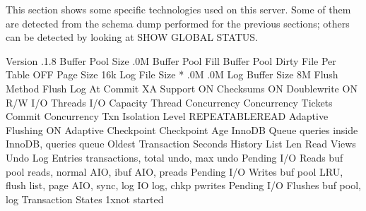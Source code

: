 \documentclass[letterpaper,10pt,english]{sphinxmanual}
\begin{document}
\sphinxAtStartPar
This section shows some specific technologies used on this server. Some of them
are detected from the schema dump performed for the previous sections; others
can be detected by looking at SHOW GLOBAL STATUS.

\begin{sphinxVerbatim}[commandchars=\\\{\}]
                  Version  .1.8
         Buffer Pool Size  .0M
         Buffer Pool Fill  \PYGZpc{}
        Buffer Pool Dirty  \PYGZpc{}
           File Per Table  OFF
                Page Size  16k
            Log File Size   * .0M  .0M
          Log Buffer Size  8M
             Flush Method 
      Flush Log At Commit  
               XA Support  ON
                Checksums  ON
              Doublewrite  ON
          R/W I/O Threads   
             I/O Capacity  
       Thread Concurrency  
      Concurrency Tickets  
       Commit Concurrency  
      Txn Isolation Level  REPEATABLE\PYGZhy{}READ
        Adaptive Flushing  ON
      Adaptive Checkpoint 
           Checkpoint Age  
             InnoDB Queue   queries inside InnoDB,  queries  queue
       Oldest Transaction   Seconds
         History List Len  
               Read Views  
         Undo Log Entries   transactions,  total undo,  max undo
        Pending I/O Reads   buf pool reads,  normal AIO,
                             ibuf AIO,  preads
       Pending I/O Writes   buf pool  LRU,  flush list,  page
                             AIO,  sync,  log IO  log,  chkp
                             pwrites
      Pending I/O Flushes   buf pool,  log
       Transaction States  1xnot started
\end{sphinxVerbatim}
\end{document}
